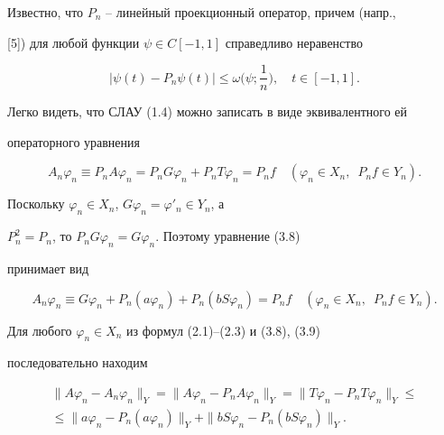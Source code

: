 Известно, что $P_n$ -- линейный проекционный оператор, причем (напр., 


[5]) для любой функции $\psi\in C[-1, 1]$ справедливо неравенство


\begin{equation}


|\psi(t)-P_n\psi(t)|\leq\omega\bigg(\psi;\frac{1}{n}\bigg),\quad t\in[-1,1]. 


\end{equation}





Легко видеть, что СЛАУ (1.4) можно записать в виде эквивалентного ей 


операторного уравнения


\begin{equation}


A_n\varphi_n\equiv P_nA\varphi_n=P_nG\varphi_n+P_nT\varphi_n=P_nf


\quad (\varphi_n\in X_n, \ \; P_nf\in Y_n). 


\end{equation}


Поскольку $\varphi_n\in X_n$, $G\varphi_n=\varphi'_n\in Y_n$, а 


$P_n^2=P_n$, то $P_nG\varphi_n=G\varphi_n$. Поэтому уравнение (3.8)


принимает вид


\begin{equation}


A_n\varphi_n\equiv G\varphi_n+P_n(a\varphi_n)+P_n(bS\varphi_n)=P_nf


\quad (\varphi_n\in X_n, \ \; P_nf\in Y_n). 


\end{equation}





Для любого $\varphi_n\in X_n$ из формул (2.1)--(2.3) и (3.8), (3.9)


последовательно находим


\begin{multline}


\| A\varphi_n-A_n\varphi_n\|_Y=\| A\varphi_n-P_nA\varphi_n


\|_Y=\| T\varphi_n-P_nT\varphi_n\|_Y\leq \\


%


\leq\| a\varphi_n-P_n(a\varphi_n)\|_Y+\| bS\varphi_n-


P_n(bS\varphi_n)\|_Y. 


\end{multline}





